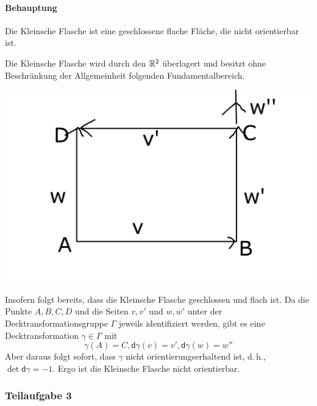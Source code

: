 \documentclass{book}
\renewcommand{\d}{\textsf{d}}
\begin{document}
\paragraph{Behauptung}
Die Kleinsche Flasche ist eine geschlossene flache Fläche, die nicht orientierbar ist.
\begin{Beweis}{}
	Die Kleinsche Flasche wird durch den $\mathbb{R}^2$ überlagert und besitzt ohne Beschränkung der Allgemeinheit folgenden Fundamentalbereich.
	\begin{center}
		\includegraphics[scale = 0.15]{Skizze3.png}	
	\end{center}
	Insofern folgt bereits, dass die Kleinsche Flasche geschlossen und flach ist. Da die Punkte $A,B,C,D$ und die Seiten $v,v'$ und $w,w'$ unter der Decktransformationsgruppe $\Gamma$ jeweils identifiziert werden, gibt es eine Decktransformation $\gamma \in \Gamma$ mit
	\[ \gamma(A) = C, \d \gamma(v) = v', \d\gamma(w) = w'' \]
	Aber daraus folgt sofort, dass $\gamma$ nicht orientierungserhaltend ist, d.\,h., $\det \d\gamma = -1$. Ergo ist die Kleinsche Flasche nicht orientierbar.
\end{Beweis}

\subsubsection{Teilaufgabe 3}
\end{document}
